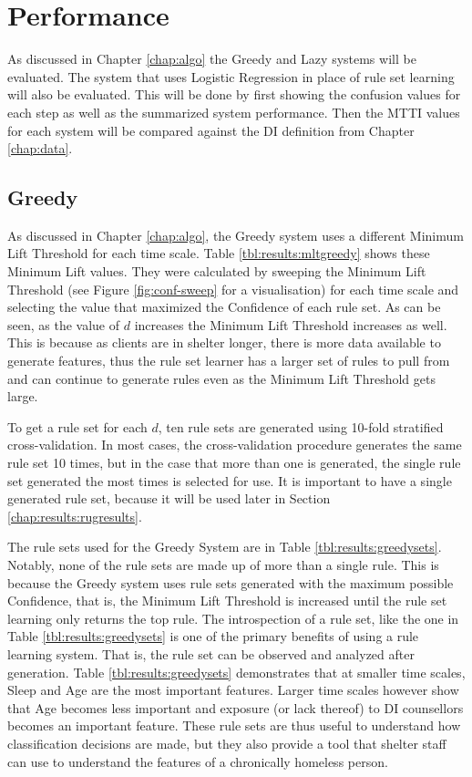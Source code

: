 \section{\Abb Performance} \label{chap:results:rapid}
As discussed in Chapter \ref{chap:algo} the Greedy and Lazy systems will be evaluated. The system that uses Logistic Regression in place of rule set learning will also be evaluated. This will be done by first showing the confusion values for each step as well as the summarized system performance. Then the MTTI values for each system will be compared against the DI definition from Chapter \ref{chap:data}.


\subsection{Greedy}
As discussed in Chapter \ref{chap:algo}, the Greedy system uses a different Minimum Lift Threshold for each time scale. Table \ref{tbl:results:mltgreedy} shows these Minimum Lift values. They were calculated by sweeping the Minimum Lift Threshold (see Figure \ref{fig:conf-sweep} for a visualisation) for each time scale and selecting the value that maximized the Confidence of each rule set. As can be seen, as the value of $d$ increases the Minimum Lift Threshold increases as well. This is because as clients are in shelter longer, there is more data available to generate features, thus the rule set learner has a larger set of rules to pull from and can continue to generate rules even as the Minimum Lift Threshold gets large.

To get a rule set for each $d$, ten rule sets are generated using 10-fold stratified cross-validation. In most cases, the cross-validation procedure generates the same rule set 10 times, but in the case that more than one is generated, the single rule set generated the most times is selected for use. It is important to have a single generated rule set, because it will be used later in Section \ref{chap:results:rugresults}.

The rule sets used for the Greedy System are in Table \ref{tbl:results:greedysets}. Notably, none of the rule sets are made up of more than a single rule. This is because the Greedy system uses rule sets generated with the maximum possible Confidence, that is, the Minimum Lift Threshold is increased until the rule set learning only returns the top rule. The introspection of a rule set, like the one in Table \ref{tbl:results:greedysets} is one of the primary benefits of using a rule learning system. That is, the rule set can be observed and analyzed after generation.
Table \ref{tbl:results:greedysets} demonstrates that at smaller time scales, Sleep and Age are the most important features. Larger time scales however show that Age becomes less important and exposure (or lack thereof) to DI counsellors becomes an important feature. These rule sets are thus useful to understand how classification decisions are made, but they also provide a tool that shelter staff can use to understand the features of a chronically homeless person.

